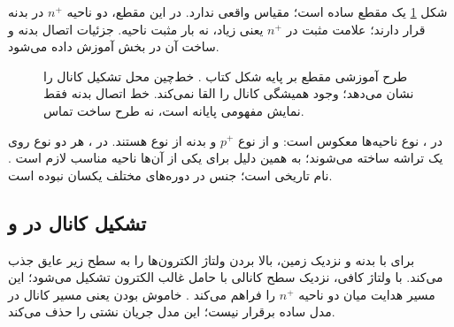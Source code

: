 شکل \ref{fig:ch1-crosssection} یک مقطع ساده  است؛ مقیاس واقعی ندارد.
در این مقطع، دو ناحیه \(n^+\) در بدنه  قرار دارند؛
علامت مثبت در \(n^+\) یعنی  زیاد، نه بار مثبت ناحیه.
جزئیات اتصال بدنه و ساخت آن در بخش  آموزش داده می‌شود.
\begin{figure}[ht]
\centering
\begin{latin}
\end{latin}
\caption{طرح آموزشی مقطع  بر پایه شکل  کتاب
\cite{weste}. خط‌چین محل تشکیل کانال را نشان می‌دهد؛ وجود همیشگی کانال را القا نمی‌کند.
خط اتصال بدنه فقط نمایش مفهومی پایانه است، نه طرح ساخت تماس.}
\label{fig:ch1-crosssection}
\end{figure}

در ، نوع ناحیه‌ها معکوس است:  و  از نوع
\(p^+\) و بدنه از نوع  هستند. در ، هر دو نوع روی یک تراشه
ساخته می‌شوند؛ به همین دلیل برای یکی از آن‌ها ناحیه مناسب  لازم است
\cite[صفحات چاپی ۷ و ۸]{weste}.
نام  تاریخی است؛ جنس  در دوره‌های مختلف یکسان نبوده است.

\subsection{تشکیل کانال در  و }
برای  با بدنه و  نزدیک زمین، بالا بردن ولتاژ
 الکترون‌ها را به سطح زیر عایق جذب می‌کند.
با ولتاژ کافی، نزدیک سطح کانالی با حامل غالب الکترون تشکیل می‌شود؛
این  مسیر هدایت میان دو ناحیه \(n^+\) را فراهم می‌کند
\cite[صفحه چاپی ۸]{weste}\cite[اسلایدهای ۶ و ۷]{mos}.
خاموش بودن یعنی مسیر کانال در مدل ساده برقرار نیست؛ این مدل جریان نشتی را حذف می‌کند.

